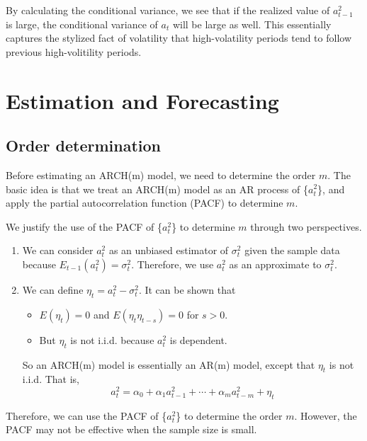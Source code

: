 \documentclass[a4paper,11pt]{article}
\begin{document}
By calculating the conditional variance, we see that if the realized
value of \(a^2_{t-1}\) is large, the conditional variance of \(a_t\) will
be large as well. This essentially captures the stylized fact of
volatility that high-volatility periods tend to follow previous
high-volitility periods.


\section{Estimation and Forecasting}
\label{sec:org8faa78b}

\subsection{Order determination}
\label{sec:orgb902c7b}

Before estimating an ARCH(m) model, we need to determine the order
\(m\). The basic idea is that we treat an ARCH(m) model as an AR process
of \{\(a^2_t\)\}, and apply the partial autocorrelation function (PACF) to
determine \(m\).

We justify the use of the PACF of \{\(a^2_t\)\} to determine \(m\) through
two perspectives.
\begin{enumerate}
\item We can consider \(a^2_t\) as an unbiased estimator of \(\sigma^2_t\)
given the sample data because \(E_{t-1}(a^2_t) =
   \sigma^2_t\). Therefore, we use \(a^2_t\) as an approximate to
\(\sigma^2_t\).
\item We can define \(\eta_t = a^2_t - \sigma^2_t\). It can be shown that
\begin{itemize}
\item \(E(\eta_t) = 0\) and \(E(\eta_t \eta_{t-s})=0\) for \(s > 0\).
\item But \(\eta_t\) is not i.i.d. because \(a^2_t\) is dependent.
\end{itemize}
So an ARCH(m) model is essentially an AR(m) model, except
that \(\eta_t\) is not i.i.d. That is,
\[ a^2_t = \alpha_0 + \alpha_1 a^2_{t-1} + \cdots + \alpha_m
   a^2_{t-m} + \eta_t \]
\end{enumerate}

Therefore, we can use the PACF of \{\(a^2_t\)\} to determine the order
\(m\). However, the PACF may not be effective when the sample size is
small.
\end{document}
